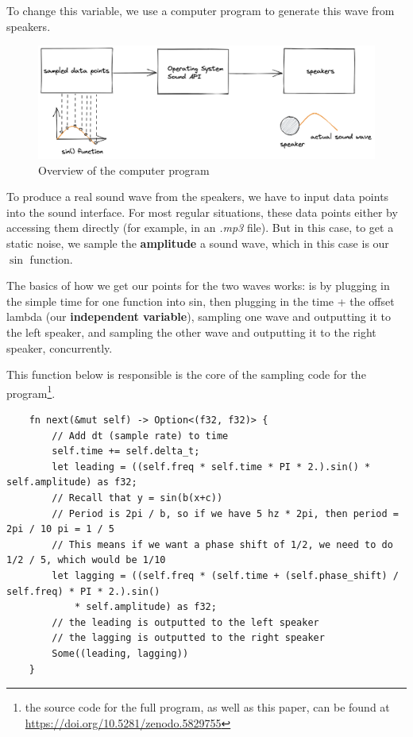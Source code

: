 \documentclass[index]{subfiles}
\begin{document}
To change this variable, we use a computer program to generate this wave from speakers.

\begin{figure}[H]
    \centering
    \includegraphics[scale=0.2]{layout.png}
    \caption{Overview of the computer program}
\end{figure}

To produce a real sound wave from the speakers, we have to input data points into the sound interface. For most regular situations, these data points either by accessing them directly (for example, in an \textit{.mp3} file). But in this case, to get a static noise, we sample the \textbf{amplitude} a sound wave, which in this case is our \(\sin\) function.

The basics of how we get our points for the two waves works: is by plugging in the simple time for one function into sin, then plugging in the time + the offset lambda (our \textbf{independent variable}), sampling one wave and outputting it to the left speaker, and sampling the other wave and outputting it to the right speaker, concurrently.

This function below is responsible is the core of the sampling code for the program\footnote[1]{the source code for the full program, as well as this paper, can be found at \href{https://doi.org/10.5281/zenodo.5829755}{https://doi.org/10.5281/zenodo.5829755}}.

\begin{verbatim}
    fn next(&mut self) -> Option<(f32, f32)> {
        // Add dt (sample rate) to time
        self.time += self.delta_t;
        let leading = ((self.freq * self.time * PI * 2.).sin() * self.amplitude) as f32;
        // Recall that y = sin(b(x+c))
        // Period is 2pi / b, so if we have 5 hz * 2pi, then period = 2pi / 10 pi = 1 / 5
        // This means if we want a phase shift of 1/2, we need to do 1/2 / 5, which would be 1/10
        let lagging = ((self.freq * (self.time + (self.phase_shift) / self.freq) * PI * 2.).sin()
            * self.amplitude) as f32;
        // the leading is outputted to the left speaker
        // the lagging is outputted to the right speaker
        Some((leading, lagging))
    }
\end{verbatim}
\end{document}
